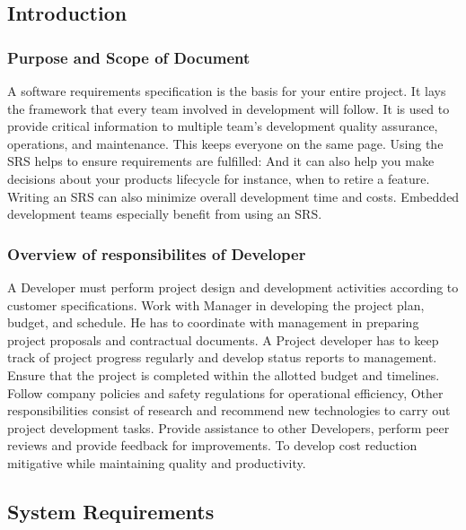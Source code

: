 \documentclass[oneside, 12pt]{book}
\begin{document}
		\subsection{Introduction}
			\subsubsection{Purpose and Scope of Document}
				A software requirements specification is the basis for your entire project. It lays the framework that every team involved in development will follow. It is used to provide critical information to multiple team’s development quality assurance, operations, and maintenance. This keeps everyone on the same page. Using the SRS helps to ensure requirements are fulfilled: And it can also help you make decisions about your products lifecycle for instance, when to retire a feature. Writing an SRS can also minimize overall development time and costs. Embedded development teams especially benefit from using an SRS.
			\subsubsection{Overview of responsibilites of Developer}
				A Developer must perform project design and development activities according to customer specifications. Work with Manager in developing the project plan, budget, and schedule. He has to coordinate with management in preparing project proposals and contractual documents. A Project developer has to keep track of project progress regularly and develop status reports to management. Ensure that the project is completed within the allotted budget and timelines. Follow company policies and safety regulations for operational efficiency, Other responsibilities consist of research and recommend new technologies to carry out project development tasks. Provide assistance to other Developers, perform peer reviews and provide feedback for improvements. To develop cost reduction mitigative while maintaining quality and productivity.
		\subsection{System Requirements}
\end{document}
